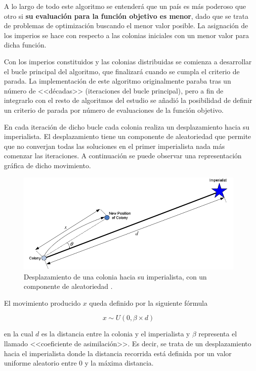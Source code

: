 A lo largo de todo este algoritmo se entenderá que un país es más poderoso que otro si \textbf{su evaluación para la función objetivo es menor}, dado que se trata de problemas de optimización buscando el menor valor posible. La asignación de los imperios se hace con respecto a las colonias iniciales con un menor valor para dicha función.

Con los imperios constituidos y las colonias distribuidas se comienza a desarrollar el bucle principal del algoritmo, que finalizará cuando se cumpla el criterio de parada. La implementación de este algoritmo originalmente paraba tras un número de <<décadas>> (iteraciones del bucle principal), pero a fin de integrarlo con el resto de algoritmos del estudio se añadió la posibilidad de definir un criterio de parada por número de evaluaciones de la función objetivo.

En cada iteración de dicho bucle cada colonia realiza un desplazamiento hacia su imperialista. El desplazamiento tiene un componente de aleatoriedad que permite que no converjan todas las soluciones en el primer imperialista nada más comenzar las iteraciones. A continuación se puede observar una representación gráfica de dicho movimiento.

\begin{figure}[h]
	\centering
	\includegraphics[scale=0.4]{imagenes/ica-desplazamiento.png}
	\caption{Desplazamiento de una colonia hacia su imperialista, con un componente de aleatoriedad \cite{ica-conference}.}
	\label{ica-desplazamiento}
\end{figure}

El movimiento producido $x$ queda definido por la siguiente fórmula

\begin{equation}\label{ica-eq-desplazamiento1}
x \sim U(0, \beta \times d)
\end{equation}

en la cual $d$ es la distancia entre la colonia y el imperialista y $\beta$ representa el llamado <<coeficiente de asimilación>>. Es decir, se trata de un desplazamiento hacia el imperialista donde la distancia recorrida está definida por un valor uniforme aleatorio entre 0 y la máxima distancia.

